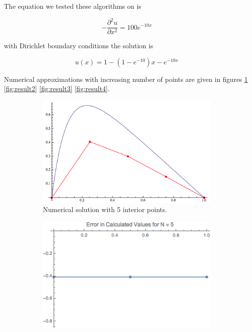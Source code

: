 \documentclass[twocolumn, groupedaddress]{revtex4-1}
\begin{document}
The equation we tested these algorithms on is

\begin{equation}
- \frac{\partial^2 u}{\partial x^2} = 100 e^{-10x}
\end{equation}

with Dirichlet boundary conditions the solution is

\begin{equation}
u(x) = 1 - \left( 1 - e^{-10} \right) x - e^{-10x}
\end{equation}

Numerical approximations with increasing number of points are given in figures \ref{fig:result1} \ref{fig:result2} \ref{fig:result3} \ref{fig:result4}.

\begin{figure}
	\centering
	\begin{subfigure}{.5\textwidth}
  		\centering
  		\includegraphics[width=.9\linewidth]{solutionN5}
  		\caption{Numerical solution with 5 interior points.}
	\end{subfigure}%
	\begin{subfigure}{.5\textwidth}
  		\centering
  		\includegraphics[width=.9\linewidth]{solutionErrorN5}
  		\caption{}
	\end{subfigure}
	
	\caption{\label{fig:result1}}
\end{figure}
\end{document}
